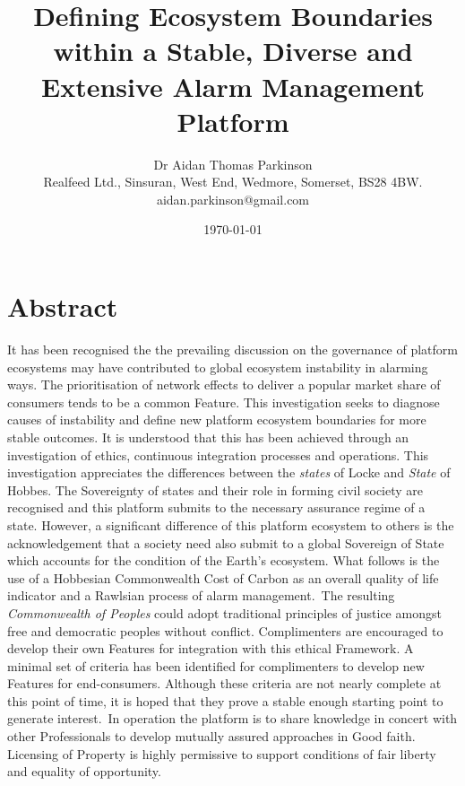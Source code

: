 \documentclass[11pt, oneside]{article}   	%
\title{Defining Ecosystem Boundaries within a Stable, Diverse and Extensive Alarm Management Platform}
\author{Dr Aidan Thomas Parkinson\\ Realfeed Ltd., Sinsuran, West End, Wedmore, Somerset, BS28 4BW.\\ aidan.parkinson@gmail.com}
\date{\today}							%
\begin{document}
\maketitle

\section*{Abstract}
It has been recognised the the prevailing discussion on the governance of platform ecosystems may have contributed to global ecosystem instability in alarming ways.
The prioritisation of network effects to deliver a popular market share of consumers tends to be a common Feature.
This investigation seeks to diagnose causes of instability and define new platform ecosystem boundaries for more stable outcomes.
It is understood that this has been achieved through an investigation of ethics, continuous integration processes and operations.
This investigation appreciates the differences between the \emph{states} of Locke and \emph{State} of Hobbes.
The Sovereignty of states and their role in forming civil society are recognised and this platform submits to the necessary assurance regime of a state.
However, a significant difference of this platform ecosystem to others is the acknowledgement that a society need also submit to a global Sovereign of State which accounts for the condition of the Earth's ecosystem.
What follows is the use of a Hobbesian Commonwealth Cost of Carbon as an overall quality of life indicator and a Rawlsian process of alarm management.\
The resulting \emph{Commonwealth of Peoples} could adopt traditional principles of justice amongst free and democratic peoples without conflict.
Complimenters are encouraged to develop their own Features for integration with this ethical Framework.
A minimal set of criteria has been identified for complimenters to develop new Features for end-consumers.
Although these criteria are not nearly complete at this point of time, it is hoped that they prove a stable enough starting point to generate interest.\
In operation the platform is to share knowledge in concert with other Professionals to develop mutually assured approaches in Good faith.
Licensing of Property is highly permissive to support conditions of fair liberty and equality of opportunity.

\pagebreak
\end{document}
